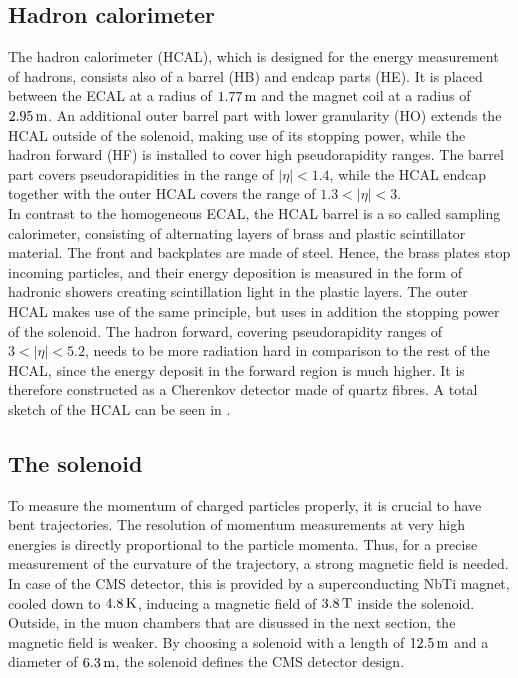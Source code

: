 \subsection{Hadron calorimeter}
The hadron calorimeter (HCAL), which is designed for the energy measurement of hadrons, consists also of a barrel (HB) and endcap parts (HE). It is placed between the ECAL at a radius of $1.77\,\text{m}$ and the magnet coil at a radius of $2.95\,\text{m}$. An additional outer barrel part with lower granularity (HO) extends the HCAL outside of the solenoid, making use of its stopping power, while the hadron forward (HF) is installed to cover high pseudorapidity ranges. The barrel part covers pseudorapidities in the range of $|\eta|<1.4$, while the HCAL endcap together with the outer HCAL covers the range of $1.3<|\eta|<3$.\\
In contrast to the homogeneous ECAL, the HCAL barrel is a so called sampling calorimeter, consisting of alternating layers of brass and plastic scintillator material. The front and backplates are made of steel. Hence, the brass plates stop incoming particles, and their energy deposition is measured in the form of hadronic showers creating scintillation light in the plastic layers. The outer HCAL makes use of the same principle, but uses in addition the stopping power of the solenoid. The hadron forward, covering pseudorapidity ranges of $3<|\eta|<5.2$, needs to be more radiation hard in comparison to the rest of the HCAL, since the energy deposit in the forward region is much higher. It is therefore constructed as a Cherenkov detector made of quartz fibres. A total sketch of the HCAL can be seen in .

\subsection{The solenoid}
To measure the momentum of charged particles properly, it is crucial to have bent trajectories. The resolution of momentum measurements at very high energies is directly proportional to the particle momenta. Thus, for a precise measurement of the curvature of the trajectory, a strong magnetic field is needed. In case of the CMS detector, this is provided by a superconducting NbTi magnet, cooled down to $4.8\,\text{K}$, inducing a magnetic field of $3.8\,\text{T}$ inside the solenoid. Outside, in the muon chambers that are disussed in the next section, the magnetic field is weaker. By choosing a solenoid with a length of $12.5\,\text{m}$ and a diameter of $6.3\,\text{m}$, the solenoid defines the CMS detector design.

